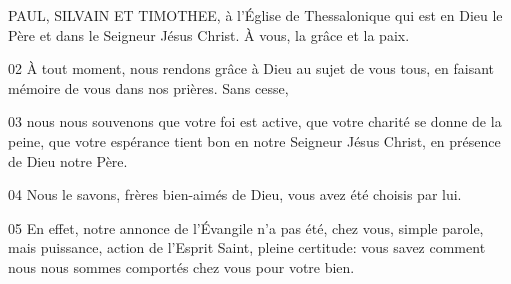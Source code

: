 PAUL, SILVAIN ET TIMOTHEE, à l’Église de Thessalonique qui est en Dieu le Père et dans le Seigneur Jésus Christ. À vous, la grâce et la paix.

02 À tout moment, nous rendons grâce à Dieu au sujet de vous tous, en faisant mémoire de vous dans nos prières. Sans cesse,

03 nous nous souvenons que votre foi est active, que votre charité se donne de la peine, que votre espérance tient bon en notre Seigneur Jésus Christ, en présence de Dieu notre Père.

04 Nous le savons, frères bien-aimés de Dieu, vous avez été choisis par lui.

05 En effet, notre annonce de l’Évangile n’a pas été, chez vous, simple parole, mais puissance, action de l’Esprit Saint, pleine certitude: vous savez comment nous nous sommes comportés chez vous pour votre bien.
